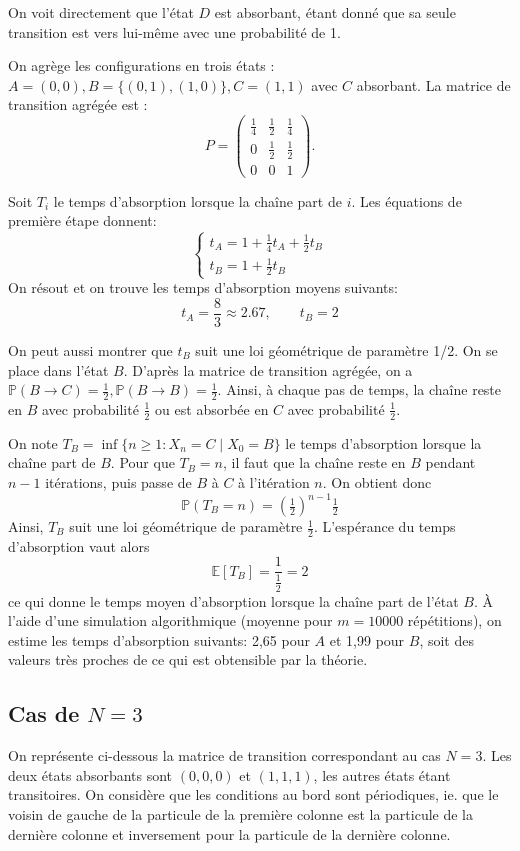\documentclass[11pt,a4paper]{article}
\begin{document}
On voit directement que l'état $D$ est absorbant, étant donné que sa
seule transition est vers lui-même avec une probabilité de 1.

On agrège les configurations en trois états :
$A = (0,0),
B = \{(0,1),(1,0)\},
C = (1,1)$
avec $C$ absorbant.
La matrice de transition agrégée est :
\[
P =
\begin{pmatrix}
\frac14 & \frac12 & \frac14 \\
0 & \frac12 & \frac12 \\
0 & 0 & 1
\end{pmatrix}.
\]

Soit $T_i$ le temps d'absorption lorsque la chaîne part de $i$.
Les équations de première étape donnent:
\[
\begin{cases}
t_A = 1 + \frac14 t_A + \frac12 t_B\\[4pt]
t_B = 1 + \frac12 t_B
\end{cases}
\]
On résout et on trouve les temps d'absorption moyens suivants:
\[
\boxed{t_A = \frac{8}{3} \approx 2.67, \qquad t_B = 2}
\]

On peut aussi montrer que $t_B$ suit une loi géométrique de paramètre
1/2.  On se place dans l’état $B$. D’après la matrice de transition
agrégée, on a $\mathbb P(B \to C)=\tfrac12, \mathbb P(B \to
B)=\tfrac12$.  Ainsi, à chaque pas de temps, la chaîne reste en $B$
avec probabilité $\tfrac12$ ou est absorbée en $C$ avec probabilité
$\tfrac12$.

On note
$
T_B = \inf\{n \ge 1 : X_n = C \mid X_0 = B\}
$
le temps d’absorption lorsque la chaîne part de $B$.  
Pour que $T_B = n$, il faut que la chaîne reste en $B$ pendant $n-1$ itérations, 
puis passe de $B$ à $C$ à l’itération $n$. On obtient donc
\[
\mathbb P(T_B = n) = \left(\tfrac12\right)^{n-1}\tfrac12
\]
Ainsi, $T_B$ suit une loi géométrique de paramètre $\tfrac12$.
L’espérance du temps d’absorption vaut alors
\[
\mathbb E[T_B] = \frac{1}{\tfrac12} = 2
\]
ce qui donne le temps moyen d’absorption lorsque la chaîne part de l’état $B$.
À l'aide d'une simulation algorithmique (moyenne pour $m = 10000$
répétitions), on estime les temps d'absorption suivants: 2,65 pour
$A$ et 1,99 pour $B$, soit des valeurs très proches de
ce qui est obtensible par la théorie.

\subsection{Cas de $N = 3$}

On représente ci-dessous la matrice de transition correspondant au cas
$N=3$.  Les deux états absorbants sont $(0,0,0)$ et $(1,1,1)$, les
autres états étant transitoires.  On considère que les conditions au
bord sont périodiques, ie. que le voisin de gauche de la particule de
la première colonne est la particule de la dernière colonne et
inversement pour la particule de la dernière colonne.
\end{document}
